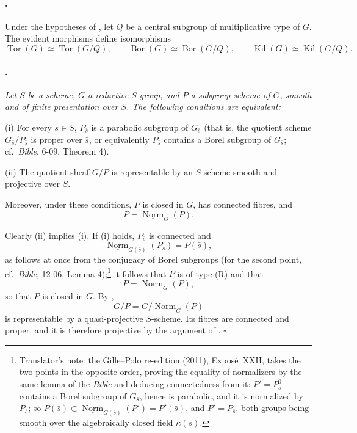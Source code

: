 \paragraph{.}
Under the hypotheses of , let \(Q\) be a central subgroup of
multiplicative type of \(G\). The evident morphisms define
isomorphisms
\[
  \underline{\operatorname{Tor}}(G)
  \simeq
  \underline{\operatorname{Tor}}(G/Q),
  \qquad
  \underline{\operatorname{Bor}}(G)
  \simeq
  \underline{\operatorname{Bor}}(G/Q),
  \qquad
  \underline{\operatorname{Kil}}(G)
  \simeq
  \underline{\operatorname{Kil}}(G/Q).
\]

\paragraph{.}
{\itshape Let \(S\) be a scheme, \(G\) a reductive \(S\)-group, and
\(P\) a subgroup scheme of \(G\), smooth and of finite presentation
over \(S\). The following conditions are equivalent:

\textup{(i)} For every \(s\in S\), \(P_{\bar s}\) is a parabolic
subgroup of \(G_{\bar s}\) \textup{(that is, the quotient scheme
\(G_{\bar s}/P_{\bar s}\) is proper over \(\bar s\), or equivalently
\(P_{\bar s}\) contains a Borel subgroup of \(G_{\bar s}\); cf.\
\emph{Bible}, 6-09, Theorem 4)}.

\textup{(ii)} The quotient sheaf \(G/P\) is representable by an
\(S\)-scheme smooth and projective over \(S\).

Moreover, under these conditions, \(P\) is closed in \(G\), has
connected fibres, and
\[
  P=\underline{\operatorname{Norm}}_G(P).
\]}

Clearly \textup{(ii)} implies \textup{(i)}. If \textup{(i)} holds,
\(P_{\bar s}\) is connected and
\[
  \underline{\operatorname{Norm}}_{G(\bar s)}(P_{\bar s})
  =
  P(\bar s),
\]
as follows at once from the conjugacy of Borel subgroups \textup{(for
the second point, cf.\ \emph{Bible}, 12-06, Lemma 4)};\footnote{Translator's note: the Gille--Polo re-edition (2011), Exposé~XXII, takes the two
points in the opposite order, proving the equality of normalizers by the same
lemma of the \emph{Bible} and deducing connectedness from it:
\(P'=P_{\bar s}^{0}\) contains a Borel subgroup of \(G_{\bar s}\), hence is
parabolic, and it is normalized by \(P_{\bar s}\); so
\(P(\bar s)\subset\underline{\operatorname{Norm}}_{G(\bar s)}(P')=P'(\bar s)\),
and \(P'=P_{\bar s}\), both groups being smooth over the algebraically closed
field \(\kappa(\bar s)\).} it
follows that \(P\) is of type \textup{(R)} and that
\[
  P=\underline{\operatorname{Norm}}_G(P),
\]
so that \(P\) is closed in \(G\). By ,
\[
  G/P=G/\underline{\operatorname{Norm}}_G(P)
\]
is representable by a quasi-projective \(S\)-scheme. Its fibres are
connected and proper, and it is therefore projective by the argument
of \SGARefLink{sga3:xxii:cor:5.8.3}{5.8.3}.
\hfill\(\square\)

